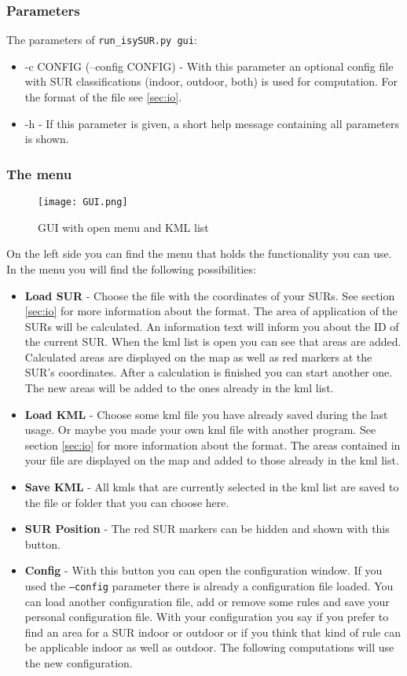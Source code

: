 \documentclass[11pt,fleqn]{book} %
\begin{document}
\subsubsection{Parameters} %
The parameters of \texttt{run\_isySUR.py gui}:
\begin{itemize}
	\item -c CONFIG (--config CONFIG) - With this parameter an optional config file with SUR classifications (indoor, outdoor, both) is used for computation. For the format of the file see \ref{sec:io}.
	\item -h - If this parameter is given, a short help message containing all parameters is shown.
\end{itemize}

\subsubsection{The menu}
\begin{figure}
\centering
\texttt{[image: GUI.png]}
\caption{GUI with open menu and KML list}
\end{figure}
On the left side you can find the menu that holds the functionality you can use. In the menu you will find the following possibilities:
\begin{itemize}
	\item \textbf{Load SUR} - Choose the file with the coordinates of your SURs. See section \ref{sec:io} for more information about the format. The area of application of the SURs will be calculated. An information text will inform you about the ID of the current SUR. When the kml list is open you can see that areas are added. Calculated areas are displayed on the map as well as red markers at the SUR's coordinates. After a calculation is finished you can start another one. The new areas will be added to the ones already in the kml list.
	\item \textbf{Load KML} - Choose some kml file you have already saved during the last usage. Or maybe you made your own kml file with another program. See section \ref{sec:io} for more information about the format. The areas contained in your file are displayed on the map and added to those already in the kml list. %
	\item \textbf{Save KML} - All kmls that are currently selected in the kml list are saved to the file or folder that you can choose here.
	\item \textbf{SUR Position} - The red SUR markers can be hidden and shown with this button.
	\item \textbf{Config} - With this button you can open the configuration window. If you used the \texttt{--config} parameter there is already a configuration file loaded. You can load another configuration file, add or remove some rules and save your personal configuration file. With your configuration you say if you prefer to find an area for a SUR indoor or outdoor or if you think that kind of rule can be applicable indoor as well as outdoor. The following computations will use the new configuration.
\end{itemize}
\end{document}
